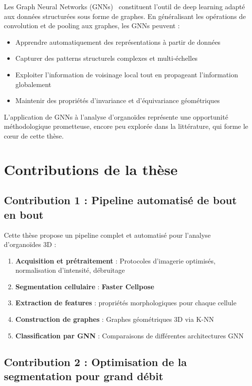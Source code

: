 Les Graph Neural Networks (GNNs)~\cite{Wu2021,Zhou2020,Battaglia2018} constituent l'outil de deep learning adapté aux données structurées sous forme de graphes. En généralisant les opérations de convolution et de pooling aux graphes, les GNNs peuvent :
\begin{itemize}
    \item Apprendre automatiquement des représentations à partir de données
    \item Capturer des patterns structurels complexes et multi-échelles
    \item Exploiter l'information de voisinage local tout en propageant l'information globalement
    \item Maintenir des propriétés d'invariance et d'équivariance géométriques
\end{itemize}

L'application de GNNs à l'analyse d'organoïdes représente une opportunité méthodologique prometteuse, encore peu explorée dans la littérature, qui forme le cœur de cette thèse.

\section{Contributions de la thèse}

\subsection{Contribution 1 : Pipeline automatisé de bout en bout}

Cette thèse propose un pipeline complet et automatisé pour l'analyse d'organoïdes 3D :

\begin{enumerate}
    \item \textbf{Acquisition et prétraitement} : Protocoles d'imagerie optimisés, normalisation d'intensité, débruitage
    \item \textbf{Segmentation cellulaire} : \textbf{Faster Cellpose} 
    \item \textbf{Extraction de features} : propriétés morphologiques pour chaque cellule
    \item \textbf{Construction de graphes} : Graphes géométriques 3D via K-NN
    \item \textbf{Classification par GNN} : Comparaisons de différentes architectures GNN
\end{enumerate}

\subsection{Contribution 2 : Optimisation de la segmentation pour grand débit}

